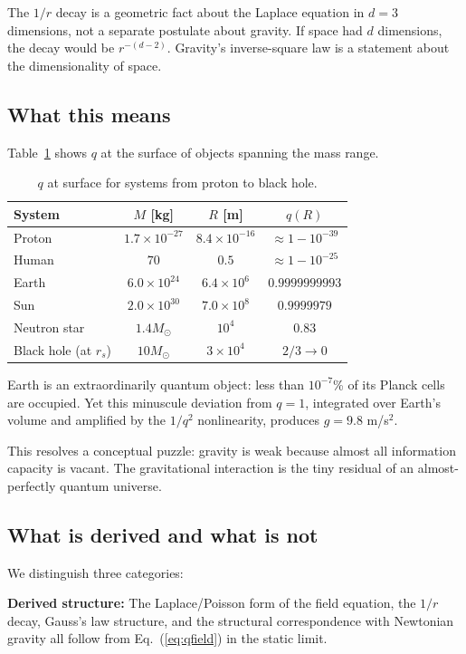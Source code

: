 \documentclass[reprint]{revtex4-2}
\begin{document}
The $1/r$ decay is a geometric fact about the Laplace equation in $d=3$ dimensions, not a separate postulate about gravity. If space had $d$ dimensions, the decay would be $r^{-(d-2)}$. Gravity's inverse-square law is a statement about the dimensionality of space.

\subsection{What this means}

Table~\ref{tab:scales} shows $q$ at the surface of objects spanning the mass range.

\begin{table}[h]
\caption{$q$ at surface for systems from proton to black hole.}
\label{tab:scales}
\begin{tabular}{lccc}
\toprule
System & $M$ [kg] & $R$ [m] & $q(R)$ \\
\midrule
Proton & $1.7\times10^{-27}$ & $8.4\times10^{-16}$ & $\approx 1-10^{-39}$ \\
Human & $70$ & $0.5$ & $\approx 1-10^{-25}$ \\
Earth & $6.0\times10^{24}$ & $6.4\times10^6$ & $0.9999999993$ \\
Sun & $2.0\times10^{30}$ & $7.0\times10^8$ & $0.9999979$ \\
Neutron star & $1.4M_\odot$ & $10^4$ & $0.83$ \\
Black hole (at $r_s$) & $10M_\odot$ & $3\times10^4$ & $2/3\to 0$ \\
\bottomrule
\end{tabular}
\end{table}

Earth is an extraordinarily quantum object: less than $10^{-7}$\% of its Planck cells are occupied. Yet this minuscule deviation from $q=1$, integrated over Earth's volume and amplified by the $1/q^2$ nonlinearity, produces $g=9.8$ m/s$^2$.

This resolves a conceptual puzzle: gravity is weak because almost all information capacity is vacant. The gravitational interaction is the tiny residual of an almost-perfectly quantum universe.

\subsection{What is derived and what is not}

We distinguish three categories:

\textbf{Derived structure:} The Laplace/Poisson form of the field equation, the $1/r$ decay, Gauss's law structure, and the structural correspondence with Newtonian gravity all follow from Eq.~(\ref{eq:qfield}) in the static limit.
\end{document}
